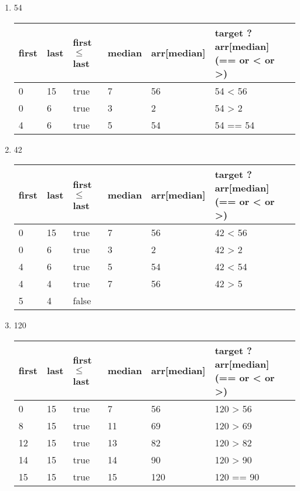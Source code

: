 \begin{answer}
\begin{enumerate}
	\item 54

\begin{tabular}{p{1cm}|p{1cm}|p{2cm}|p{1.5cm}|p{2.5cm}| p{4cm}}
  first & last & first $\leq$ last & median & arr[median] & target ? arr[median] (== or < or >)\\
  \hline
  0 & 15 & true & 7 & 56 & 54 < 56\\
  \hline
  0 & 6 & true & 3 & 2 & 54 > 2\\
  \hline
  4 & 6 & true & 5 & 54 & 54 == 54\\
  \hline
\end{tabular}

\item 42

\begin{tabular}{p{1cm}|p{1cm}|p{2cm}|p{1.5cm}|p{2.5cm}| p{4cm}}
  first & last & first $\leq$ last & median & arr[median] & target ? arr[median] (== or < or >)\\
  \hline
  0 & 15 & true & 7 & 56 & 42 < 56\\
  \hline
  0 & 6 & true & 3 & 2 & 42 > 2\\
  \hline
  4 & 6 & true & 5 & 54 & 42 < 54\\
  \hline
  4 & 4 & true & 7 & 56 & 42 > 5\\
  \hline
  5 & 4 & false &  &  & \\
  \hline      
\end{tabular}
	
\item 120

\begin{tabular}{p{1cm}|p{1cm}|p{2cm}|p{1.5cm}|p{2.5cm}| p{4cm}}
  first & last & first $\leq$ last & median & arr[median] & target ? arr[median] (== or < or >)\\
  \hline
  0 & 15 & true & 7 & 56 & 120 > 56\\
  \hline
  8 & 15 & true & 11 & 69 & 120 > 69\\
  \hline
  12 & 15 & true & 13 & 82 & 120 > 82\\
  \hline
   14 & 15 & true & 14 & 90 & 120 > 90\\
  \hline
   15 & 15 & true & 15 & 120 & 120 == 90\\
  \hline
\end{tabular}
\end{enumerate}	
\end{answer}

